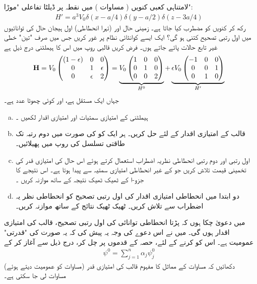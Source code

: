 لامتناہی کعبی کنویں ( مساوات  )   میں نقطہ  پر ڈیلٹا تفاعلی  "موڑا":
\begin{align*}
H' = a^3 V_0 \delta (x - a/4) \delta (y - a/2) \delta (z - 3a/4)
\end{align*}
 رکھ کر کنویں کو مضطرب کیا جاتا ہے۔ زمینی حال اور  (تہرا انحطاطی)  اول ہیجان حال کی توانائیوں میں اول رتبی تصحیح  کتنی ہو گی؟
ایک ایسے کوانٹائی نظام پر غور کریں جس میں صرف  "تین"  خطی غیر تابع حالات پائے جاتے ہوں۔  فرض کریں قالبی روپ میں اس کا ہیملٹنی درج ذیل ہے
\begin{align*}
\operatorname{\mathbf{H}} = V_0 
\begin{pmatrix}
(1 - \epsilon) & 0 & 0 \\
0 & 1 & \epsilon \\
0 & \epsilon & 2
\end{pmatrix}
= \underbrace{V_0 
\begin{pmatrix}
1 & 0 & 0 \\
0 & 1 & 0 \\
0 & 0 & 2
\end{pmatrix}}_{H^0} 
+ \underbrace{\epsilon V_0 
\begin{pmatrix}
-1 & 0 & 0 \\
0 & 0 & 1 \\
0 & 1 & 0
\end{pmatrix}}_{H'}
\end{align*}
جہاں  ایک مستقل ہے،  اور  کوئی چھوٹا عدد    ہے۔
\begin{enumerate}[a.]
\item
{}  ہیملٹنی   کے امتیازی سمتیات اور امتیازی اقدار لکھیں ۔
\item
قالب  کے    امتیازی اقدار  کے لئے حل کریں۔   ہر ایک کو  کی صورت میں دوم رتبہ تک طاقتی تسلسل کی روپ میں پھیلائیں۔ 
\item
اول رتبی اور دوم رتبی    انحطاطی نظریہ اضطراب استعمال کرتے ہوئے اس حال کی امتیازی قدر کی تخمینی قیمت تلاش کریں جو  کے غیر انحطاطی امتیازی سمتیہ سے پیدا ہوتا ہے۔  اس نتیجے   کا جزو-ا کے ٹھیک  ٹھیک نتیجہ  کے ساتھ موازنہ کریں ۔
\item
دو ابتدا میں      انحطاطی   امتیازی اقدار  کی اول رتبی تصحیح  کو انحطاطی نظر یہ اضطراب سے تلاش کریں۔   ٹھیک  ٹھیک نتائج کے ساتھ موازنہ کریں۔ 
\end{enumerate}
میں دعویٰ چکا ہوں کہ  پڑتا انحطاطی توانائی کی  اول رتبی تصحیح،   قالب  کی  امتیازی اقدار ہوں گی۔ میں نے  اس دعوے   کی وجہ یہ  پیش کی کہ یہ  صورت کی "قدرتی" عمومیت ہے۔ اس کو  کرنے کے لئے،  حصہ    کے  قدموں پر چل کر،  درج ذیل سے آغاز کر کے
\begin{align*}
\psi^0 = \sum_{j = 1}^n \alpha_j \psi_j^0
\end{align*}
(مساوات     کو  عمومیت  دیتے ہوئے)  دکھائیں کہ مساوات  کے مماثل کا مفہوم   قالب  کی امتیازی قدر مساوات  لی جا سکتی  ہے۔ 

